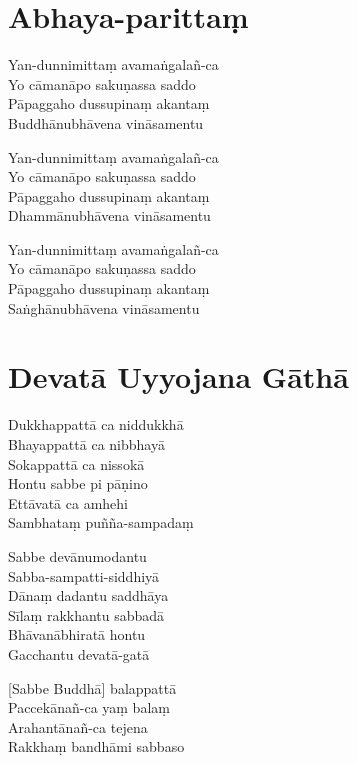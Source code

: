 \chapter{Abhaya-parittaṃ}%


\begin{paritta}
Yan-dunnimittaṃ avamaṅgalañ-ca\\
Yo cāmanāpo sakuṇassa saddo\\
Pāpaggaho dussupinaṃ akantaṃ\\
Buddhānubhāvena vināsamentu

Yan-dunnimittaṃ avamaṅgalañ-ca\\
Yo cāmanāpo sakuṇassa saddo\\
Pāpaggaho dussupinaṃ akantaṃ\\
Dhammānubhāvena vināsamentu

Yan-dunnimittaṃ avamaṅgalañ-ca\\
Yo cāmanāpo sakuṇassa saddo\\
Pāpaggaho dussupinaṃ akantaṃ\\
Saṅghānubhāvena vināsamentu
\end{paritta}

\chapter{Devatā Uyyojana Gāthā}%


\begin{paritta}
Dukkhappattā ca niddukkhā\\
Bhayappattā ca nibbhayā\\
Sokappattā ca nissokā\\
Hontu sabbe pi pāṇino\\
Ettāvatā ca amhehi\\
Sambhataṃ puñña-sampadaṃ

Sabbe devānumodantu\\
Sabba-sampatti-siddhiyā\\
Dānaṃ dadantu saddhāya\\
Sīlaṃ rakkhantu sabbadā\\
Bhāvanābhiratā hontu\\
Gacchantu devatā-gatā

[Sabbe Buddhā] balappattā\\
Paccekānañ-ca yaṃ balaṃ\\
Arahantānañ-ca tejena\\
Rakkhaṃ bandhāmi sabbaso
\end{paritta}

